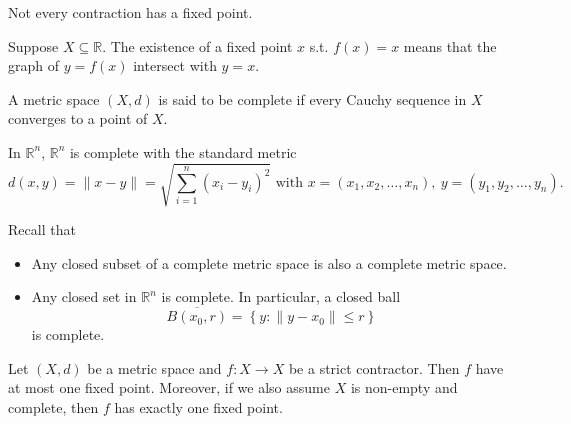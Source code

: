 \begin{remark}
    Not every contraction has a fixed point.
\end{remark}

\begin{remark}
    Suppose \(X \subseteq \mathbb{R} \). The existence of a fixed point \(x\) s.t. \(f(x) = x\) means that the graph of \(y = f(x)\) intersect with \(y = x\).    
\end{remark}

\begin{definition}
    A metric space \((X, d)\) is said to be complete if every Cauchy sequence in \(X\) converges to a point of \(X\).
\end{definition}

\begin{eg}
    In \(\mathbb{R} ^n\), \(\mathbb{R} ^n\) is complete with the standard metric 
    \[
        d(x, y) = \lVert x - y \rVert = \sqrt{\sum_{i=1}^n (x_i - y_i)^2 } \text{ with } x = (x_1, x_2, \dots , x_n), \ y = (y_1, y_2, \dots , y_n).   
    \]  
\end{eg}

\begin{remark}
    Recall that 
    \begin{itemize}
        \item Any closed subset of a complete metric space is also a complete metric space. 
        \item Any closed set in \(\mathbb{R} ^n\) is complete. In particular, a closed ball 
        \[
            \overline{B(x_0, r)} = \left\{ y : \lVert y - x_0 \rVert \le r  \right\}  
        \] 
        is complete.
    \end{itemize}
\end{remark}

\begin{theorem} \label{thm: Contraction Mapping Theorem}
    Let \((X, d)\) be a metric space and \(f:X \to X\) be a strict contractor. Then \(f\) have at most one fixed point. Moreover, if we also assume \(X\) is non-empty and complete, then \(f\) has exactly one fixed point.     
\end{theorem}

